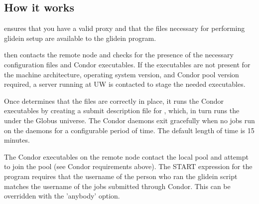 \subsection{How it works}
 ensures that you have a valid proxy and that the files
necessary for performing glidein setup are available to the glidein
program. 

 then contacts the remote node and checks for the
presence of the necessary configuration files and Condor executables.
If the executables are not present for the machine architecture, 
operating system version, and Condor pool version required, a 
server running at UW is contacted to stage the needed executables.

Once  determines that the files are correctly in place,
it runs the Condor executables by creating a submit description file for 
, which, in turn runs the  under the Globus 
universe.
The Condor daemons exit gracefully when no jobs run on the daemons for a 
configurable period of time. The default length of time is 15 minutes.

The Condor executables on the remote node contact the local pool and
attempt to join the pool (see Condor requirements above). The START
expression for the  program requires that the username
of the person who ran the glidein script matches the username of the jobs 
submitted through Condor. This can be overridden with the 'anybody' option.

